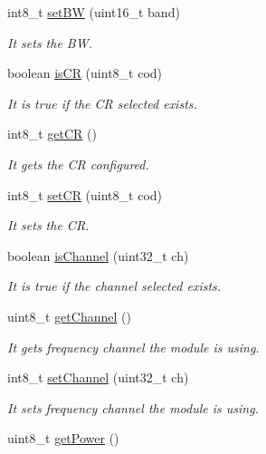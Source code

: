 \begin{DoxyCompactItemize}
int8\+\_\+t \hyperlink{class_wasp_s_x1272_a840451b65bbc28a5df23c7d07bd64412}{set\+BW} (uint16\+\_\+t band)
\begin{DoxyCompactList}\small\item\em It sets the BW. \end{DoxyCompactList}\item 
boolean \hyperlink{class_wasp_s_x1272_a98e73c32ea04a4a00587dc4b0f8230ff}{is\+CR} (uint8\+\_\+t cod)
\begin{DoxyCompactList}\small\item\em It is true if the CR selected exists. \end{DoxyCompactList}\item 
int8\+\_\+t \hyperlink{class_wasp_s_x1272_abe2c5576eec220edbc7c140911714793}{get\+CR} ()
\begin{DoxyCompactList}\small\item\em It gets the CR configured. \end{DoxyCompactList}\item 
int8\+\_\+t \hyperlink{class_wasp_s_x1272_a47579d6c4557f9e8f80ecffd73b367a9}{set\+CR} (uint8\+\_\+t cod)
\begin{DoxyCompactList}\small\item\em It sets the CR. \end{DoxyCompactList}\item 
boolean \hyperlink{class_wasp_s_x1272_ac999b789c15c3eb30e1be8c58abfe356}{is\+Channel} (uint32\+\_\+t ch)
\begin{DoxyCompactList}\small\item\em It is true if the channel selected exists. \end{DoxyCompactList}\item 
uint8\+\_\+t \hyperlink{class_wasp_s_x1272_a3cc92221cf256e40e3c659dab8f00829}{get\+Channel} ()
\begin{DoxyCompactList}\small\item\em It gets frequency channel the module is using. \end{DoxyCompactList}\item 
int8\+\_\+t \hyperlink{class_wasp_s_x1272_a1623397f18fff0d0f4464db9d18df523}{set\+Channel} (uint32\+\_\+t ch)
\begin{DoxyCompactList}\small\item\em It sets frequency channel the module is using. \end{DoxyCompactList}\item 
uint8\+\_\+t \hyperlink{class_wasp_s_x1272_a824818f55b70107652287cf0db5f4f5d}{get\+Power} ()

\end{DoxyCompactItemize}
